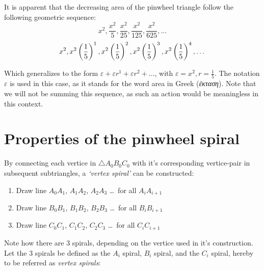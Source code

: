 \noindent
It is apparent that the decreasing area of the pinwheel triangle follow the following geometric sequence:
\begin{equation}
    x^2, \frac{x^2}{5}, \frac{x^2}{25}, \frac{x^2}{125}, \frac{x^2}{625}, \ldots
\end{equation}
\begin{equation}
    x^2, x^2\left(\frac{1}{5}\right)^1, x^2\left(\frac{1}{5}\right)^2, x^2\left(\frac{1}{5}\right)^3, x^2\left(\frac{1}{5}\right)^4, \ldots \\
\end{equation}

\noindent
Which generalizes to the form $\varepsilon + \varepsilon r^1 + \varepsilon r^2 + \ldots$, with $\varepsilon = x^2, r = \frac{1}{5}$. The notation $\varepsilon$ is used in this case, as it stands for the word area in Greek (\emph{έκταση}). Note that we will not be summing this sequence, as such an action would be meaningless in this context.

\newpage
\section{Properties of the pinwheel spiral}
By connecting each vertice in $\triangle A_{0}B_{0}C_{0}$ with it's corresponding vertice-pair in subsequent subtriangles, a \emph{`vertex spiral'} can be constructed:

\begin{enumerate}
    \item Draw line $A_{0}A_{1}$, $A_{1}A_{2}$, $A_{2}A_{3}$ \ldots\ for all $A_{i}A_{i + 1}$
    \item Draw line $B_{0}B_{1}$, $B_{1}B_{2}$, $B_{2}B_{3}$ \ldots\ for all $B_{i}B_{i + 1}$
    \item Draw line $C_{0}C_{1}$, $C_{1}C_{2}$, $C_{2}C_{3}$ \ldots\ for all $C_{i}C_{i + 1}$
\end{enumerate}



\noindent
Note how there are 3 spirals, depending on the vertice used in it's construction. Let the 3 spirals be defined as the $A_{i}$ spiral, $B_{i}$ spiral, and the $C_{i}$ spiral, hereby to be referred as \emph{vertex spirals}:







\newpage
